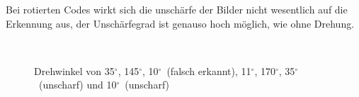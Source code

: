 Bei rotierten Codes wirkt sich die unschärfe der Bilder nicht wesentlich auf die Erkennung aus, der Unschärfegrad ist genauso hoch möglich, wie ohne Drehung.
\begin{figure}[H]
  \centering
  \setlength{\fboxrule}{1pt}
  \\
  \caption[EAN-13 Rotation]{Drehwinkel von 35$^\circ$, 145$^\circ$, 10$^\circ$~(falsch erkannt), 11$^\circ$, 170$^\circ$, 35$^\circ$~(unscharf) und 10$^\circ$~(unscharf)}
  \label{fig:eanrotate}
\end{figure}

